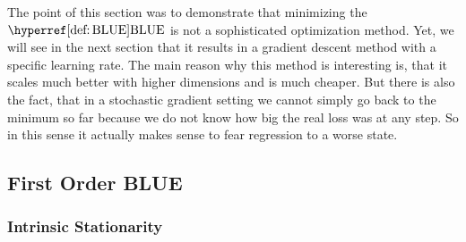 The point of this section was to demonstrate that minimizing the
\(\BLUE\) is not a sophisticated optimization method. Yet, we will see in the
next section that it results in a gradient descent method with a specific
learning rate. The main reason why this method is interesting is, that it scales
much better with higher dimensions and is much cheaper. But there is also the
fact, that in a stochastic gradient setting we cannot simply go back to
the minimum so far because we do not know how big the real loss was at any step.
So in this sense it actually makes sense to fear regression to a worse state.

\subsection{First Order BLUE}

\subsubsection{Intrinsic Stationarity}

